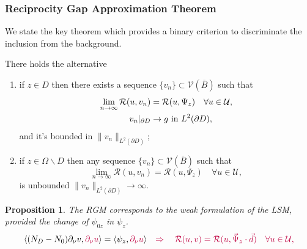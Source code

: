 \documentclass[10pt,xcolor={dvipsnames}]{beamer}
\newcommand\smallscriptsize{\fontsize{6}{2}\selectfont}
\newtheorem{proposition}[subsection]{Proposition}
\theoremstyle{plain}
\theoremstyle{plain}
\begin{document}
\begin{frame}
 \frametitle{Reciprocity Gap Approximation Theorem}
 \vspace{-0.1cm}
 {\smallscriptsize
 We state the key theorem which provides a binary criterion to discriminate the inclusion from the background.}
\begin{theorem}
 \label{theo:approximation-rg}
 \footnotesize
There holds the alternative
 \begin{enumerate}
  \item if {\color{blue}$z \in D$} then there exists a sequence $\{v_n\} \subset \mathcal{V}(\overline{B})$ such that
   \begin{align}
     \lim_{n\to\infty}\mathcal{R}(u,v_n) &= \mathcal{R}(u,\Psi_z)\quad\forall u\in\mathcal{U},\label{eq:rg-lim-constructive}\\
     v_n|_{\partial D}&\to g \textup{ in } L^2(\partial D),
   \end{align}
   and it's bounded in $\|v_n\|_{L^2(\partial D)}$;
  \item if {\color{blue}$z \in \Omega \backslash D$} then any sequence $\{v_n\} \subset \mathcal{V}(\overline{B})$ such that
   \begin{equation}
     \lim_{n\to\infty}\mathcal{R}(u,v_n) = \mathcal{R}(u,\Psi_z)\quad\forall u\in\mathcal{U}\label{eq:rg-lim-counterpart},
   \end{equation}
   is unbounded $\|v_n\|_{L^2(\partial D)}\to\infty$.
 \end{enumerate}
\end{theorem}
\begin{proposition}
\footnotesize
 The RGM corresponds to the {\color{blue}weak formulation} of the LSM,
 provided the change of $\psi_{0z}$ in $\psi_z$.
\begin{equation}
\langle({N_D} - {N_0})\partial_\nu v, {\color{purple}\partial_\nu u}\rangle = \langle\psi_{z},{\color{purple}\partial_\nu u}\rangle
{\color{purple}
\quad \Rightarrow
\quad   \mathcal{R}(u, v) = \mathcal{R}(u, \vec{\Psi}_z\cdot\vec{d})
\quad \forall u \in \mathcal{U},}
\end{equation}

\end{proposition}
\end{frame}
\end{document}
